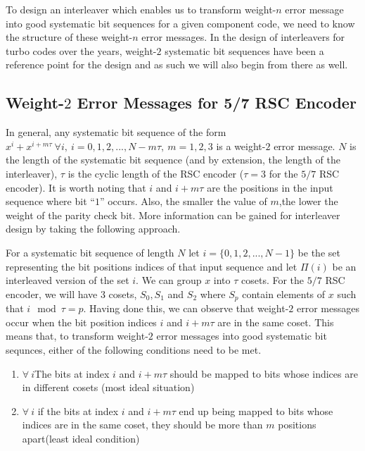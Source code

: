 \documentclass[11pt, oneside, dvipdfmx]{book}
\begin{document}
 To design an interleaver which enables us to transform weight-$n$ error message into good systematic bit sequences for a given component code, we need to know the structure of these weight-$n$ error messages. In the design of interleavers for turbo codes over the years, weight-$2$ systematic bit sequences have been a reference point for the design and as such we will also begin from there as well.
 
 \subsection{Weight-$2$ Error Messages for 5/7 RSC Encoder}
 In general, any systematic bit sequence of the form $x^i +x^{i+m\tau}~\forall i,~i=0,1,2,...,N-m\tau,~m=1,2,3$ is a weight-$2$ error message. $N$ is the length of the systematic bit sequence (and by extension, the length of the interleaver), $\tau$ is the cyclic length of the RSC encoder ($\tau=3$ for the $5/7$ RSC encoder). It is worth noting that $i$ and $i+m\tau$ are the positions in the input sequence where bit ``$1$'' occurs. Also, the smaller the value of $m$,the lower the weight of the parity check bit. More information can be gained for interleaver design by taking the following approach. 
 
 For a systematic bit sequence of length $N$ let $i=\{0,1,2,...,N-1\}$ be the set representing the bit positions indices of that input sequence and let $\Pi(i)$ be an interleaved version of the set $i$. We can group $x$ into $\tau$ cosets. For the $5/7$ RSC encoder, we will have 3 cosets, $S_0,S_1$ and $S_2$ where $S_p$ contain elements of $x$ such that $i \mod \tau = p$. Having done this, we can observe that weight-$2$ error messages occur when the bit position indices $i$ and $i+m\tau$ are in the same coset. This means that, to transform weight-$2$ error messages into good systematic bit sequnces, either of the following conditions need to be met. 
 
 
 \begin{enumerate}
 \item $\forall~i $The bits at index $i$ and $i+m\tau$ should be mapped to bits whose indices are in different cosets (most ideal situation)
 
 \item $\forall~i $ if the bits at index $i$ and $i+m\tau$ end up being mapped to bits whose indices are in the same coset, they should be more than $m$ positions apart(least ideal condition)
 \end{enumerate}
 
\end{document}
